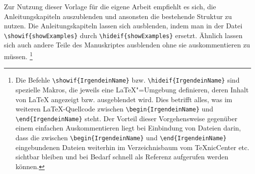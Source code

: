 \begin{showExamples}
Zur Nutzung dieser Vorlage für die eigene Arbeit empfiehlt es sich, die Anleitungskapiteln auszublenden und ansonsten die bestehende Struktur zu nutzen.
Die Anleitungskapiteln lassen sich ausblenden, indem man in der Datei
\verb+\showif{showExamples}+ durch \verb+\hideif{showExamples}+ ersetzt.
Ähnlich lassen sich auch andere Teile des Manuskriptes ausblenden ohne sie auskommentieren zu müssen.%
%
\footnote{Die Befehle \verb+\showif{IrgendeinName}+ bzw. \verb+\hideif{IrgendeinName}+ sind spezielle Makros, die jeweils eine LaTeX"=Umgebung  definieren,
deren Inhalt von LaTeX{} angezeigt bzw. ausgeblendet wird.
Dies betrifft alles, was im weiteren \LaTeX-Quellcode zwischen \verb+\begin{IrgendeinName}+ und \verb+\end{IrgendeinName}+ steht.
Der Vorteil dieser Vorgehensweise gegenüber einem einfachen Auskommentieren liegt bei Einbindung von Dateien darin,
dass die zwischen \verb+\begin{IrgendeinName}+ und \verb+\end{IrgendeinName}+ eingebundenen Dateien
weiterhin im Verzeichnisbaum vom TeXnicCenter etc. sichtbar bleiben und bei Bedarf schnell als Referenz aufgerufen werden können.}
%














%
%
%
%
%
%
%
%
%
\end{showExamples}%